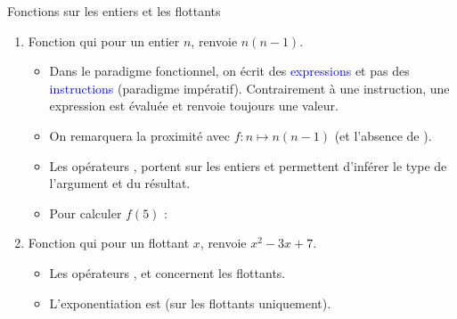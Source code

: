\documentclass[10pt]{beamer}
\begin{document}
\begin{frame}{\Ctitle}{\stitle}
	\begin{exampleblock}{Fonctions sur les entiers et les flottants}
		\begin{enumerate}
			\item<1-> Fonction qui pour un entier $n$, renvoie $n(n-1)$.
				\begin{itemize}
					\item<2->{\textcolor{BrickRed}{\danger} Dans le paradigme fonctionnel, on écrit des \textcolor{blue}{expressions} et pas des \textcolor{blue}{instructions} (paradigme impératif). Contrairement à une instruction, une expression est évaluée et renvoie toujours une valeur.}
					\item<3->{ On remarquera la proximité avec  $f : n \mapsto n(n-1)$ (et l'absence de  ).}
					\item<4->{ Les opérateurs \kw{*}, \kw{-} portent sur les entiers et permettent d'inférer le type de l'argument et du résultat.}
					\item<5->{ Pour calculer $f(5)$ : }
				\end{itemize}
			\item<6-> Fonction qui pour un flottant $x$, renvoie $x^2-3x+7$.
				\begin{itemize}
					\item<7-> Les opérateurs ,  et  concernent les flottants.
					\item<8-> L'exponentiation est \kw{**} (sur les flottants uniquement).
				\end{itemize}
		\end{enumerate}
	\end{exampleblock}
\end{frame}
\end{document}
